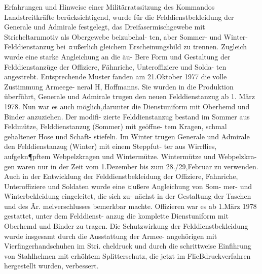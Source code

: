 

Erfahrungen und Hinweise einer Militärratssitzung
des Kommandos Landstreitkräfte berücksichtigend,
wurde für die Felddienstbekleidung der Generale
und Admirale festgelegt, das Dreifasermischgewebe
mit Stricheltarnmotiv als Obergewebe beizubehal-
ten, aber Sommer- und Winter-Felddienstanzug bei
¤ußerlich gleichem Erscheinungsbild zu trennen.
Zugleich wurde eine starke Angleichung an die äu-
Bere Form und Gestaltung der Felddienstanzüge der Offiziere, Fähnriche, Unteroffiziere und Solda-
ten angestrebt. Entsprechende Muster fanden am
21.Oktober 1977 die volle Zustimmung Armeege-
neral H, Hoffmanns. Sie wurden in die Produktion
überführt, Generale und Admirale trugen den
neuen Felddienstanzug ab 1. März 1978. Nun war
es auch möglich,darunter die Dienstuniform mit
Oberhemd und Binder anzuziehen. Der modifi-
zierte Felddienstanzug bestand im Sommer aus
Feldmütze, Felddienstanzug (Sommer) mit geöffne-
tem Kragen, schmal gehaltener Hose und Schaft-
stiefeln. Im Winter trugen Generale und Admirale
den Felddienstanzug (Winter) mit einem Steppfut-
ter aus Wirrflies, aufgekn¶pftem Webpelzkragen
und Wintermütze. Wintermütze und Webpelzkra-
gen waren nur in der Zeit vom 1.Dezember bis zum
28./29,Februar zu verwenden.
Auch in der Entwicklung der Felddienstbekleidung der Offiziere, Fahnriche, Unteroffiziere und
Soldaten wurde eine ¤ußere Angleichung von Som-
mer- und Winterbekleidung eingeleitet, die sich zu-
nächst in der Gestaltung der Taschen und des Ãr.
melverschlusses bemerkbar machte. Offizieren war
es ab 1.März 1978 gestattet, unter dem Felddienst-
anzug die komplette Dienstuniform mit Oberhemd
und Binder zu tragen.
Die Schutzwirkung der Felddienstbekleidung
wurde insgesamt durch die Ausstattung der Armee-
angehörigen mit Vierfingerhandschuhen im Stri.
cheldruck und durch die schrittweise Einfihrung
von Stahlhelmen mit erhöhtem Splitterschutz, die
jetzt im FlieBdruckverfahren hergestellt wurden,
verbessert.